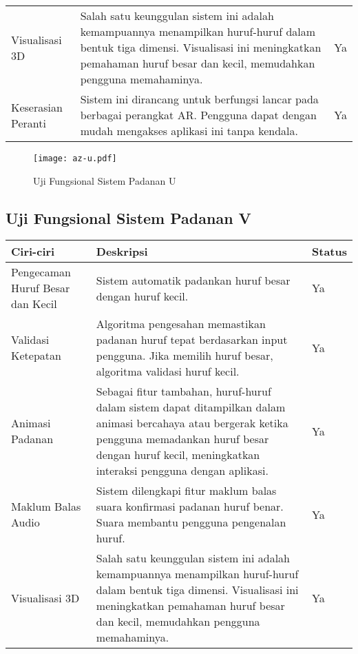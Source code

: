 \begin{itemize}
\begin{itemize}
\begin{itemize}
\begin{itemize}
\begin{itemize}
\begin{itemize}
\begin{itemize}
\begin{itemize}
\begin{flushleft}
\begin{tabular}{>{\raggedright}p{3cm}>{\raggedright}p{8cm}>{\raggedright\arraybackslash}p{2cm}}
Visualisasi 3D & Salah satu keunggulan sistem ini adalah kemampuannya menampilkan huruf-huruf dalam bentuk tiga dimensi. Visualisasi ini meningkatkan pemahaman huruf besar dan kecil, memudahkan pengguna memahaminya. & Ya \\

Keserasian Peranti & Sistem ini dirancang untuk berfungsi lancar pada berbagai perangkat AR. Pengguna dapat dengan mudah mengakses aplikasi ini tanpa kendala. & Ya \\
\bottomrule
\end{tabular}

\begin{figure}
    \centering
    \texttt{[image: az-u.pdf]}
    \caption{Uji Fungsional  Sistem Padanan U }
    \label{fig:az-s.pdf}
\end{figure}
\subsection{Uji Fungsional  Sistem Padanan V}

\begin{tabular}{>{\raggedright}p{3cm}p{9cm}>{\centering\arraybackslash}p{2cm}}
\toprule
\textbf{Ciri-ciri} & \textbf{Deskripsi} & \textbf{Status} \\
\midrule
Pengecaman Huruf Besar dan Kecil & Sistem automatik padankan huruf besar dengan huruf kecil. & Ya \\

Validasi Ketepatan & Algoritma pengesahan memastikan padanan huruf tepat berdasarkan input pengguna. Jika memilih huruf besar, algoritma validasi huruf kecil. & Ya \\

Animasi Padanan & Sebagai fitur tambahan, huruf-huruf dalam sistem dapat ditampilkan dalam animasi bercahaya atau bergerak ketika pengguna memadankan huruf besar dengan huruf kecil, meningkatkan interaksi pengguna dengan aplikasi. & Ya \\

Maklum Balas Audio & Sistem dilengkapi fitur maklum balas suara konfirmasi padanan huruf benar. Suara membantu pengguna pengenalan huruf. & Ya \\

Visualisasi 3D & Salah satu keunggulan sistem ini adalah kemampuannya menampilkan huruf-huruf dalam bentuk tiga dimensi. Visualisasi ini meningkatkan pemahaman huruf besar dan kecil, memudahkan pengguna memahaminya. & Ya \\


\end{tabular}
\end{flushleft}
\end{itemize}
\end{itemize}
\end{itemize}
\end{itemize}
\end{itemize}
\end{itemize}
\end{itemize}
\end{itemize}
